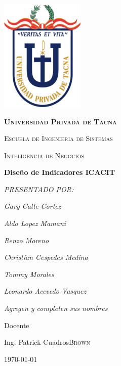 \documentclass[12pt,a4paper]{report}
\begin{document}
\begin{titlepage}
	\centering
	\includegraphics[width=4cm]{./images/upt}\par\vspace{1cm}
	{\scshape\LARGE\huge\bfseries Universidad Privada de Tacna \par}
	{\scshape\LARGE Escuela de Ingenieria de Sistemas \par}
	\vspace{1cm}
	{\scshape\Large Inteligencia de Negocios\par}
	\vspace{0.5cm}
	{\huge\bfseries Diseño de Indicadores ICACIT\par}
	\vspace{1cm}

	{\Large\itshape PRESENTADO POR:\par}
	{\Large\itshape Gary Calle Cortez\par}
	{\Large\itshape Aldo Lopez Mamani\par}
	{\Large\itshape Renzo Moreno\par}
	{\Large\itshape Christian Cespedes Medina\par}
	{\Large\itshape Tommy Morales\par}
	{\Large\itshape Leonardo Acevedo Vasquez\par}
	{\Large\itshape Agregen y completen sus nombres\par}
	\vfill
	Docente\par
	Ing. Patrick Cuadros\textsc{Brown}

	\vfill

	{\large \today\par}

\end{titlepage}

\begin{abstract}
Esta es una plantilla simple para crear un articulo \LaTeX en español, con algunos comandos que se usarán frecuentemente para hacer tareas de la licenciatura en Física.
\end{abstract}
\end{document}
